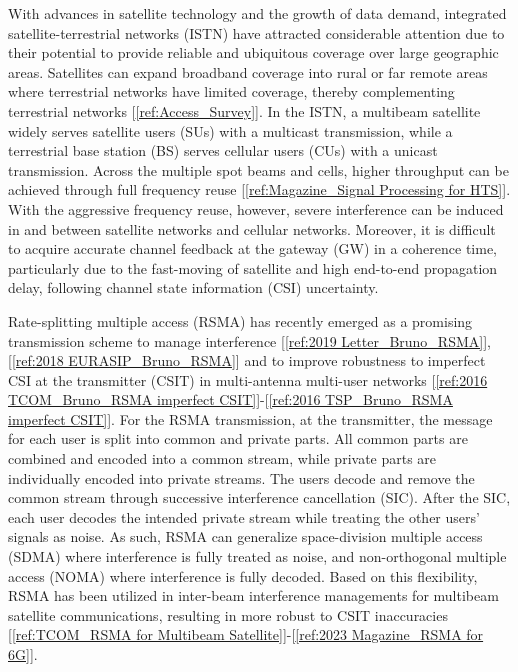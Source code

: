 \documentclass[draftclsnofoot, onecolumn, comsoc, 12pt]{IEEEtran}
\begin{document}
With advances in satellite technology and the growth of data demand, integrated satellite-terrestrial networks (ISTN) have attracted considerable attention due to their potential to provide reliable and ubiquitous coverage over large geographic areas. Satellites can expand broadband coverage into rural or far remote areas where terrestrial networks have limited coverage, thereby complementing terrestrial networks [\ref{ref:Access_Survey}].
In the ISTN, a multibeam satellite widely serves satellite users (SUs) with a multicast transmission, while a terrestrial base station (BS) serves cellular users (CUs) with a unicast transmission. 
Across the multiple spot beams and cells, higher throughput can be achieved through full frequency reuse [\ref{ref:Magazine_Signal Processing for HTS}].
With the aggressive frequency reuse, however, severe interference can be induced in and between satellite networks and cellular networks. Moreover, it is difficult to acquire accurate channel feedback at the gateway (GW) in a coherence time, particularly due to the fast-moving of satellite and high end-to-end propagation delay, following channel state information (CSI) uncertainty.

Rate-splitting multiple access (RSMA) has recently emerged as a promising transmission scheme to manage interference [\ref{ref:2019 Letter_Bruno_RSMA}], [\ref{ref:2018 EURASIP_Bruno_RSMA}] and to improve robustness to imperfect CSI at the transmitter (CSIT) in multi-antenna multi-user networks [\ref{ref:2016 TCOM_Bruno_RSMA imperfect CSIT}]-[\ref{ref:2016 TSP_Bruno_RSMA imperfect CSIT}]. 
For the RSMA transmission, at the transmitter, the message for each user is split into common and private parts. 
All common parts are combined and encoded into a common stream, while private parts are individually encoded into private streams. The users decode and remove the common stream through successive interference cancellation (SIC).
After the SIC, each user decodes the intended private stream while treating the other users' signals as noise. 
As such, RSMA can generalize space-division multiple access (SDMA) where interference is fully treated as noise, and non-orthogonal multiple access (NOMA) where interference is fully decoded.
Based on this flexibility,  RSMA has been utilized in inter-beam interference managements for multibeam satellite communications, resulting in  more robust to CSIT inaccuracies \mbox{[\ref{ref:TCOM_RSMA for Multibeam Satellite}]-[\ref{ref:2023 Magazine_RSMA for 6G}]}.
\end{document}
